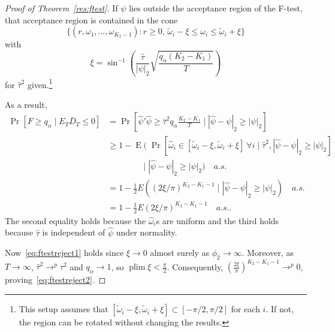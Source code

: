 \documentclass[11pt]{article}
\DeclareMathOperator{\E}{E}
\DeclareMathOperator*{\plim}{plim}
\newcommand{\oosB}{\bar{D}_{T}}
\begin{document}
\begin{proof}[Proof of Theorem~\ref{res:ftest}]
If $\psi$ lies outside the acceptance region of the F-test, that
acceptance region is contained in the cone
\[\{(r, \omega_1,\dots,\omega_{K_2-1}) : r \geq 0,\, \tilde{\omega}_{i}
- \xi \leq \omega_i \leq \tilde{\omega}_i + \xi\}\]
with
\[
 \xi = \sin^{-1}(\frac{\hat{\tau}}{|\psi|_2}\sqrt{\frac{q_\alpha (K_2-K_1)}{T}})
\] 
for $\hat{\tau}^2$ given.\footnote{This setup assumes that
  $[\tilde\omega_i - \xi, \tilde\omega_i + \xi] \subset
  [-\pi/2,\pi/2]$ for each $i$.  If not, the region can be rotated
  without changing the results.}


As a result,
\begin{align*}
  \Pr[F \geq q_{\alpha} \mid E_T \oosB \leq 0] &=
  \Pr[\hat{\psi}'\hat{\psi} \geq \hat \tau^2 q_\alpha \frac{K_2 -
    K_1}{T}
  \mid |\hat{\psi}-\psi|_2 \geq |\psi|_2] \\
  &\geq 1 - \E(\;\Pr[ \hat{\omega}_i \in [\tilde{\omega}_i - \xi,
  \tilde{\omega}_i + \xi] \ \forall i \mid \hat{\tau}^2,
  |\hat{\psi}-\psi|_2 \geq |\psi|_2] \\
  &\qquad\qquad \mid |\hat{\psi}-\psi|_2 \geq |\psi|_2)\quad a.s. \\
  &= 1 - \frac12 E ((2\xi / \pi)^{K_2-K_1-1}\mid
  |\hat{\psi}-\psi|_2 \geq |\psi|_2)\quad a.s. \\
  &= 1 - \frac12 E (2\xi/\pi)^{K_2-K_1-1} \quad a.s..
\end{align*}
The second equality holds because the $\hat{\omega}_i$s are uniform
and the third holds because $\hat{\tau}$ is independent of
$\hat{\psi}$ under normality.

Now~\eqref{eq:ftestreject1} holds since $\xi \to 0$ almost surely as
$\phi_2 \to \infty.$  Moreover, as
$T\to\infty$, $\hat{\tau}^2\to^p\tau^2$ and $q_{\alpha}\to 1$, so
$\plim \xi < \frac{\pi}{2}$.  Consequently,
$(\frac{2\xi}{\pi})^{K_2-K_1-1}\to^p0$, proving~\eqref{eq:ftestreject2}.
\end{proof}


\end{document}
